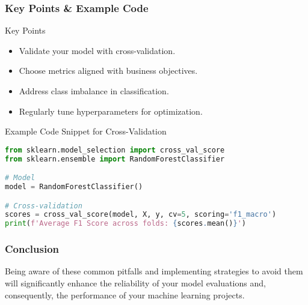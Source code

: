 \documentclass[aspectratio=169]{beamer}
\begin{document}
\begin{frame}[fragile]
    \frametitle{Key Points & Example Code}
    \begin{block}{Key Points}
        \begin{itemize}
            \item Validate your model with cross-validation.
            \item Choose metrics aligned with business objectives.
            \item Address class imbalance in classification.
            \item Regularly tune hyperparameters for optimization.
        \end{itemize}
    \end{block}

    \begin{block}{Example Code Snippet for Cross-Validation}
    \begin{lstlisting}[language=Python]
from sklearn.model_selection import cross_val_score
from sklearn.ensemble import RandomForestClassifier

# Model
model = RandomForestClassifier()

# Cross-validation
scores = cross_val_score(model, X, y, cv=5, scoring='f1_macro')
print(f'Average F1 Score across folds: {scores.mean()}')
    \end{lstlisting}
    \end{block}
\end{frame}

\begin{frame}[fragile]
    \frametitle{Conclusion}
    Being aware of these common pitfalls and implementing strategies to avoid them will significantly enhance the reliability of your model evaluations and, consequently, the performance of your machine learning projects.
\end{frame}
\end{document}
